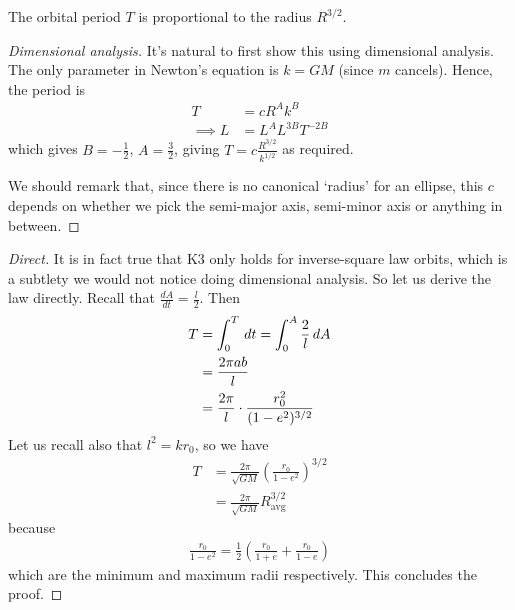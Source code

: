 \documentclass{../template/note}
\begin{document}

    \begin{proposition}
        The orbital period \(T\) is proportional to the radius \(R^{3/2}\).
    \end{proposition}
    
    \begin{proof}[Dimensional analysis]
        It's natural to first show this using dimensional analysis. The only parameter in Newton's equation is \(k = GM\) (since \(m\) cancels). Hence, the period is
        \begin{align*}
            T &= cR^Ak^B \\
            \implies \si{L} &= \si{L^A L^{3B} T^{-2B}}
        \end{align*}
        which gives \(B = -\frac 1 2\), \(A = \frac 3 2\), giving \(T = c\frac{R^{3/2}}{k^{1/2}}\) as required.  
        
        We should remark that, since there is no canonical `radius' for an ellipse, this \(c\) depends on whether we pick the semi-major axis, semi-minor axis or anything in between.
    \end{proof}

    \begin{proof}[Direct]
        It is in fact true that K3 only holds for inverse-square law orbits, which is a subtlety we would not notice doing dimensional analysis. So let us derive the law directly. Recall that \(\frac{dA}{dt} = \frac l 2\). Then
        \begin{align*}
            T &= \int_0^T \,d{t} = \int_0^A \frac 2 l \,d{A} \\
            &= \frac{2\pi ab}{l} \\
            &= \frac{2\pi} l \cdot \frac{r_0^2}{(1-e^2)^{3/2}}
        \end{align*}
        Let us recall also that \(l^2 = kr_0\), so we have
        \begin{align*}
            T &= \frac{2\pi}{\sqrt{GM}}\left(\frac{r_0}{1-e^2}\right)^{3/2} \\
            &= \frac{2\pi}{\sqrt{GM}}R_\text{avg}^{3/2}
        \end{align*}
        because
        \begin{align*}
            \frac{r_0}{1-e^2} = \frac 1 2 \left(\frac{r_0}{1+e} + \frac{r_0}{1-e}\right)
        \end{align*}
        which are the minimum and maximum radii respectively. This concludes the proof.
    \end{proof}
    
\end{document}
